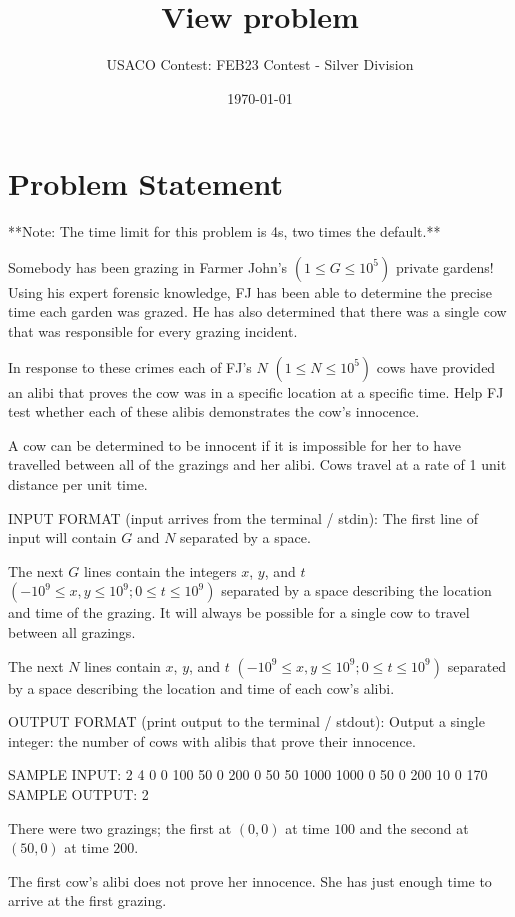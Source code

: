 \documentclass[12pt]{article}
\title{View problem}
\author{USACO Contest: FEB23 Contest - Silver Division}
\date{\today}
\begin{document}
\maketitle

\section*{Problem Statement}


**Note: The time limit for this problem is 4s, two times the default.**

Somebody has been grazing in Farmer John's $(1 \le G \le 10^5)$
private gardens! Using his expert forensic knowledge, FJ has been able to
determine the precise time each garden was grazed.  He has also determined that
there was a single cow that was responsible for every grazing incident.

In response to these crimes each of FJ's $N$ $(1 \le N \le 10^5)$
cows have provided an alibi that proves the cow was in a specific location at a
specific time.  Help FJ test whether each of these alibis demonstrates the cow's
innocence.

A cow can be determined to be innocent if it is impossible for her to have
travelled between all of the grazings and her alibi.  Cows travel at a rate of 1
unit distance per unit time.

INPUT FORMAT (input arrives from the terminal / stdin):
The first line of input will contain $G$ and $N$ separated by a space.

The next $G$ lines contain the integers $x$, $y$, and $t$
$(-10^9 \le x, y \le 10^9; 0 \le t \le 10^9)$ separated by a space
describing the location and time of the grazing.  It will always be possible for
a single cow to travel between all grazings.

The next $N$ lines contain $x$, $y$, and $t$
$(-10^9 \le x, y \le 10^9; 0 \le t \le 10^9)$ separated by a space
describing the location and time of each cow's alibi.

OUTPUT FORMAT (print output to the terminal / stdout):
Output a single integer: the number of cows with alibis that prove their
innocence.

SAMPLE INPUT:
2 4
0 0 100
50 0 200
0 50 50
1000 1000 0
50 0 200
10 0 170
SAMPLE OUTPUT: 
2

There were two grazings; the first at $(0, 0)$ at time $100$ and the
second at $(50, 0)$ at time $200$.

The first cow's alibi does not prove her innocence.  She has just enough time to
arrive at the first grazing.
\end{document}
